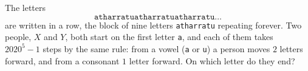 The letters
\[\texttt{atharratuatharratuatharratu}\ldots\]
are written in a row, the block of nine letters \texttt{atharratu} repeating forever. Two people, $X$ and $Y$, both start on the first letter \texttt{a}, and each of them takes $2020^5-1$ steps by the same rule: from a vowel (\texttt{a} or \texttt{u}) a person moves $2$ letters forward, and from a consonant $1$ letter forward. On which letter do they end?
